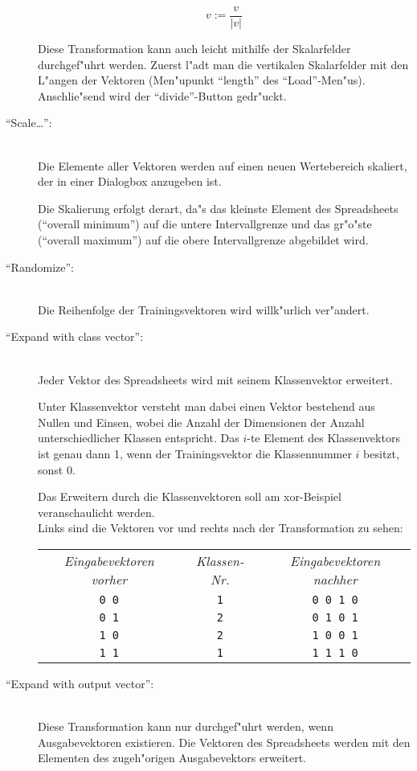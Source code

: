 \begin{description}
\[ v := \frac{v}{|v|} \]

Diese Transformation kann auch leicht mithilfe der Skalarfelder 
durchgef"uhrt werden.
Zuerst l"adt man die vertikalen Skalarfelder mit den L"angen der Vektoren
(Men"upunkt "`length"' des "`Load"'-Men"us).
Anschlie"send wird der "`divide"'-Button gedr"uckt.

\item["`Scale\ldots"':] \mbox{} \\
Die Elemente aller Vektoren werden 
auf einen neuen Wertebereich skaliert, der in einer Dialogbox anzugeben ist. 

Die Skalierung erfolgt derart, da"s das kleinste Element des Spreadsheets
("`overall minimum"') auf die untere Intervallgrenze und das gr"o"ste
("`overall maximum"') auf die obere Intervallgrenze abgebildet wird.

\item["`Randomize"':] \mbox{} \\
Die Reihenfolge der Trainingsvektoren wird willk"urlich ver"andert.

\item["`Expand with class vector"':] \mbox{} \\
Jeder Vektor des Spreadsheets wird mit seinem Klassenvektor erweitert. 

Unter Klassenvektor versteht man dabei einen Vektor bestehend aus Nullen
und Einsen, wobei die Anzahl der Dimensionen der Anzahl unterschiedlicher
Klassen entspricht. 
Das $i$-te Element des Klassenvektors ist genau dann 1, wenn der
Trainingsvektor die Klassennummer $i$ besitzt, sonst 0. 

Das Erweitern durch die Klassenvektoren soll am xor-Beispiel veranschaulicht
werden. \\
Links sind die Vektoren vor und rechts nach der Transformation zu
sehen: 

\nopagebreak
\begin{tabular}{ccc}
{\sl Eingabevektoren vorher} & {\sl Klassen-Nr.} & 
{\sl Eingabevektoren nachher} \\[1ex] 
{\tt 0 0} & {\tt 1} & {\tt 0 0 1 0} \\  
{\tt 0 1} & {\tt 2} & {\tt 0 1 0 1} \\  
{\tt 1 0} & {\tt 2} & {\tt 1 0 0 1} \\  
{\tt 1 1} & {\tt 1} & {\tt 1 1 1 0} \\  
\end{tabular}
 
\item["`Expand with output vector"':] \mbox{} \\
Diese Transformation kann nur durchgef"uhrt werden, wenn 
Ausgabevektoren existieren.
Die Vektoren des Spreadsheets werden mit den Elementen des 
zugeh"origen Ausgabevektors erweitert.


\end{description}
